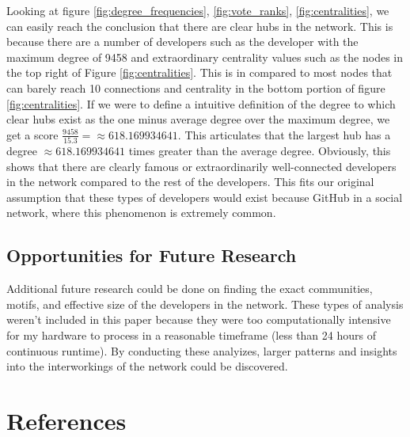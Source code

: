 \documentclass[9pt,twocolumn,twoside]{pnas-new}
\begin{document}
Looking at figure \ref{fig:degree_frequencies}, \ref{fig:vote_ranks}, \ref{fig:centralities}, we can easily reach the conclusion that there are clear hubs in the network. This is because there are a number of developers such as the developer with the maximum degree of 9458 and extraordinary centrality values such as the nodes in the top right of Figure \ref{fig:centralities}. This is in compared to most nodes that can barely reach 10 connections and centrality in the bottom portion of figure \ref{fig:centralities}. If we were to define a intuitive definition of the degree to which clear hubs exist as the one minus average degree over the maximum degree, we get a score $\frac{9458}{15.3} = \approx 618.169934641$. This articulates that the largest hub has a degree $\approx 618.169934641$ times greater than the average degree. Obviously, this shows that there are clearly famous or extraordinarily well-connected developers in the network compared to the rest of the developers. This fits our original assumption that these types of developers would exist because GitHub in a social network, where this phenomenon is extremely common. 

\subsection*{Opportunities for Future Research} Additional future research could be done on finding the exact communities, motifs, and effective size of the developers in the network. These types of analysis weren't included in this paper because they were too computationally intensive for my hardware to process in a reasonable timeframe (less than 24 hours of continuous runtime). By conducting these analyizes, larger patterns and insights into the interworkings of the network could be discovered.



\showacknow{}

\section*{References}


\end{document}
